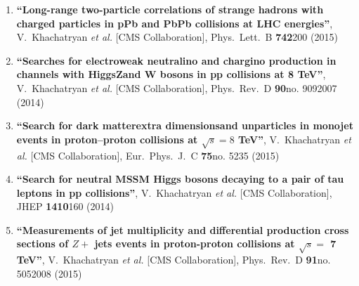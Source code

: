 \begin{enumerate}
\item%
{\bf ``Long-range two-particle correlations of strange hadrons with charged particles in pPb and PbPb collisions at LHC energies''}, 
  V.~Khachatryan {\it et al.}  [CMS Collaboration], 
Phys.\ Lett.\ B {\bf 742}200 (2015) %


\item%
{\bf ``Searches for electroweak neutralino and chargino production in channels with HiggsZand W bosons in pp collisions at 8 TeV''}, 
  V.~Khachatryan {\it et al.}  [CMS Collaboration], 
Phys.\ Rev.\ D {\bf 90}no. 9092007 (2014) %


\item%
{\bf ``Search for dark matterextra dimensionsand unparticles in monojet events in proton–proton collisions at $\sqrt{s} = 8$ TeV''}, 
  V.~Khachatryan {\it et al.}  [CMS Collaboration], 
Eur.\ Phys.\ J.\ C {\bf 75}no. 5235 (2015) %


\item%
{\bf ``Search for neutral MSSM Higgs bosons decaying to a pair of tau leptons in pp collisions''}, 
  V.~Khachatryan {\it et al.}  [CMS Collaboration], 
JHEP {\bf 1410}160 (2014) %


\item%
{\bf ``Measurements of jet multiplicity and differential production cross sections of $Z +$ jets events in proton-proton collisions at $\sqrt{s} =$ 7 TeV''}, 
  V.~Khachatryan {\it et al.}  [CMS Collaboration], 
Phys.\ Rev.\ D {\bf 91}no. 5052008 (2015) %



\end{enumerate}
